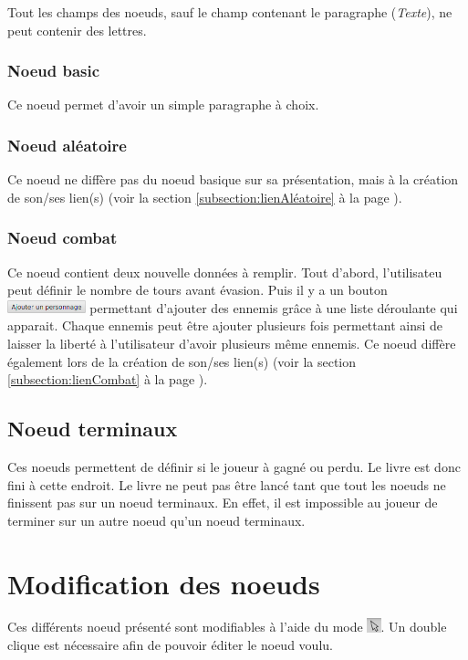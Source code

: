 			Tout les champs des noeuds, sauf le champ contenant le paragraphe (\textit{Texte}), ne peut contenir des lettres.

			\subsubsection{Noeud basic}
				Ce noeud permet d'avoir un simple paragraphe à choix.

			\subsubsection{Noeud aléatoire}
				Ce noeud ne diffère pas du noeud basique sur sa présentation, mais à la création de son/ses lien(s) (voir la section \ref{subsection:lienAléatoire} à la page \pageref{subsection:lienAléatoire}).

			\subsubsection{Noeud combat}\label{subsubsection:combat}
				Ce noeud contient deux nouvelle données à remplir. Tout d'abord, l'utilisateu peut définir le nombre de tours avant évasion. Puis il y a un bouton \includegraphics[height=10pt]{img/noeudAddPersonnage} permettant d'ajouter des ennemis grâce à une liste déroulante qui apparait. Chaque ennemis peut être ajouter plusieurs fois permettant ainsi de laisser la liberté à l'utilisateur d'avoir plusieurs même ennemis.
				Ce noeud diffère également lors de la création de son/ses lien(s) (voir la section \ref{subsection:lienCombat} à la page \pageref{subsection:lienCombat}).

		\subsection{Noeud terminaux}
			Ces noeuds permettent de définir si le joueur à gagné ou perdu. Le livre est donc fini à cette endroit. Le livre ne peut pas être lancé tant que tout les noeuds ne finissent pas sur un noeud terminaux. En effet, il est impossible au joueur de terminer sur un autre noeud qu'un noeud terminaux.

	\section{Modification des noeuds}
		Ces différents noeud présenté sont modifiables à l'aide du mode \includegraphics[height=0.4cm]{img/modeSelected.png}. Un double clique est nécessaire afin de pouvoir éditer le noeud voulu.

